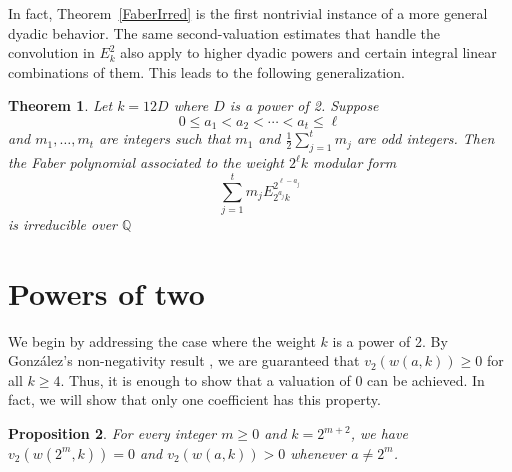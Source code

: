 \documentclass[12pt]{amsart}
\newtheorem{theorem}{Theorem}
\newtheorem{proposition}[theorem]{Proposition}
\begin{document}
In fact, Theorem~\ref{FaberIrred} is the first nontrivial instance of a more
general dyadic behavior.  The same second-valuation estimates that handle
the convolution in \(E_k^2\) also apply to higher dyadic powers and certain
integral linear combinations of them.  This leads to the following
generalization.

\begin{theorem}\label{t:linearcombo}
Let $k=12D$ where $D$ is a power of 2. Suppose \[0\leq a_1 <a_2<\cdots <a_t\leq \ell\] and $m_1,\ldots, m_t$ are integers such that $m_1$ and $\frac{1}{2}\sum_{j=1}^t m_j$ are odd integers. Then the Faber polynomial associated to the weight $2^\ell k$ modular form \[\sum_{j=1}^t m_j E_{2^{a_j}k}^{2^{\ell-a_j}}\] is irreducible over $\mathbb{Q}$
\end{theorem}


\section{Powers of two}
We begin by addressing the case where the weight $k$ is a power of 2. By Gonz\'alez's non-negativity result \cite[Theorem 7]{Gonz}, we are guaranteed that $v_2(w(a,k)) \ge 0$ for all $k\ge 4$. Thus, it is enough to show that a valuation of 0 can be achieved. In fact, we will show that only one coefficient has this property. 

\begin{proposition} \label{Powers-of-2}
For every integer $m \ge 0$ and $k = 2^{m+2}$, we have $v_2(w(2^m, k)) = 0$ and $v_2(w(a, k)) > 0$ whenever $a \neq 2^m$. 
\end{proposition}
\end{document}
